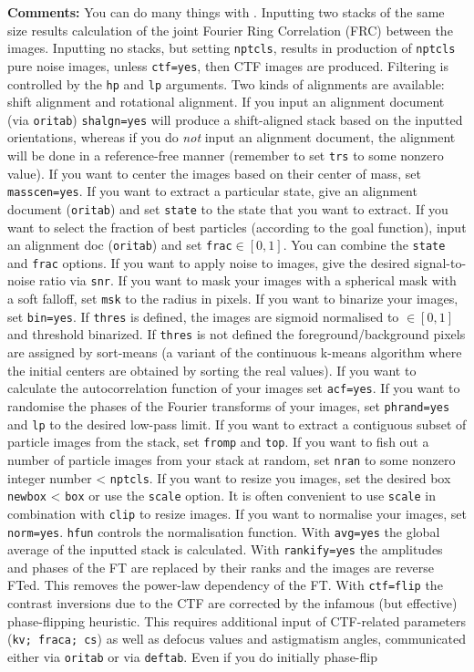 \noindent\textbf{Comments:} You can do many things with . Inputting two stacks of the same size results calculation of the joint Fourier Ring  Correlation (FRC) between the images. Inputting no stacks, but setting \texttt{nptcls}, results in production of \texttt{nptcls} pure noise images, unless \texttt{ctf=yes}, then CTF images are produced. Filtering is controlled by the \texttt{hp} and \texttt{lp} arguments. Two kinds of alignments are available: shift alignment and rotational alignment. If you input an alignment document (via \texttt{oritab}) \texttt{shalgn=yes} will produce a shift-aligned stack based on the inputted orientations, whereas if you do \textit{not} input an alignment document, the alignment will be done in a reference-free manner (remember to set \texttt{trs} to some nonzero value). If you want to center the images based on their center of mass, set \texttt{masscen=yes}. If you want to extract a particular state, give an alignment document (\texttt{oritab}) and set \texttt{state} to the state that you want to extract. If you want to select the fraction of best particles (according to the goal function), input an alignment doc (\texttt{oritab}) and set \texttt{frac}$\in{[0,1]}$. You can combine the \texttt{state} and \texttt{frac} options. If you want to apply noise to images, give the desired signal-to-noise ratio via \texttt{snr}. If you want to mask your images with a spherical mask with a soft falloff, set \texttt{msk} to the radius in pixels. If you want to binarize your images, set \texttt{bin=yes}. If \texttt{thres} is defined, the images are sigmoid normalised to $\in{[0,1]}$ and threshold binarized. If \texttt{thres} is not defined the foreground/background pixels are assigned by sort-means (a variant of the continuous k-means algorithm where the initial centers are obtained by sorting the real values). If you want to calculate the autocorrelation function of your images set \texttt{acf=yes}. If you want to randomise the phases of the Fourier transforms of your images, set \texttt{phrand=yes} and \texttt{lp} to the desired low-pass limit. If you want to extract a contiguous subset of particle images from the stack, set \texttt{fromp} and \texttt{top}. If you want to fish out a number of particle images from your stack at random, set \texttt{nran} to some nonzero integer number < \texttt{nptcls}. If you want to resize you images, set the desired box \texttt{newbox} < \texttt{box} or use the \texttt{scale} option. It is often convenient to use \texttt{scale} in combination with \texttt{clip} to resize images.  If you want to normalise your images, set \texttt{norm=yes}. \texttt{hfun} controls the normalisation function. With \texttt{avg=yes} the global average of the inputted stack is calculated. With \texttt{rankify=yes} the amplitudes and phases of the FT are replaced by their ranks and the images are reverse FTed. This removes the power-law dependency of the FT. With \texttt{ctf=flip} the contrast inversions due to the CTF are corrected by the infamous (but effective) phase-flipping heuristic. This requires additional input of CTF-related parameters (\texttt{kv; fraca; cs}) as well as defocus values and astigmatism angles, communicated either via \texttt{oritab} or via \texttt{deftab}. Even if you do initially phase-flip 